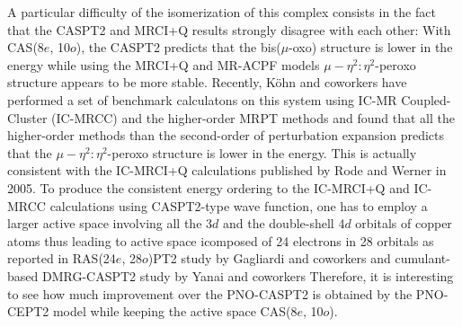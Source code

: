 \documentclass[aip,jcp,amsmath]{revtex4-1}
\begin{document}
%
A particular difficulty of the isomerization of this complex consists in the fact that the CASPT2 and MRCI+Q results strongly disagree with each other: With CAS(8$e$, 10$o$), the CASPT2 predicts that the bis($\mu$-oxo) structure is lower in the energy while using the MRCI+Q and MR-ACPF models $\mu-\eta^2:\eta^2$-peroxo structure appears to be more stable.
%
Recently, K\"ohn and coworkers\cite{AK74} have performed a set of benchmark calculatons on this system using IC-MR Coupled-Cluster (IC-MRCC)\cite{MHandKoehn2011,hanauercommunication:2012} and the higher-order MRPT methods and found that all the higher-order methods than the second-order of perturbation expansion predicts that the $\mu-\eta^2:\eta^2$-peroxo structure is lower in the energy.
%
This is actually consistent with the IC-MRCI+Q calculations published by Rode and Werner in 2005.\cite{Rode2005}
%
To produce the consistent energy ordering to the IC-MRCI+Q and IC-MRCC calculations using CASPT2-type wave function, one has to employ a larger active space involving all the 3$d$ and the double-shell 4$d$ orbitals of copper atoms thus leading to active space icomposed of 24 electrons in 28 orbitals as reported in RAS(24$e$, 28$o$)PT2 study by Gagliardi and coworkers\cite{doi:10.1021/jp056791e} and cumulant-based DMRG-CASPT2 study by Yanai and coworkers\cite{doi:10.1063/1.4900878}
%
Therefore, it is interesting to see how much improvement over the PNO-CASPT2 is obtained by the PNO-CEPT2 model while keeping the active space CAS(8$e$, 10$o$).
\end{document}
